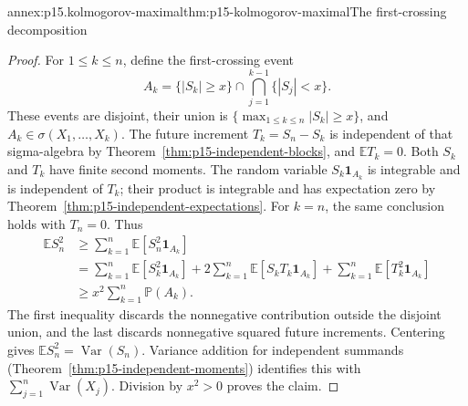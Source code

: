 \begin{annexitem}{annex:p15.kolmogorov-maximal}{thm:p15-kolmogorov-maximal}{The first-crossing decomposition}
\begin{proof}
For \(1\leq k\leq n\), define the first-crossing event
\[
 A_k=\{|S_k|\geq x\}\cap
                  \bigcap_{j=1}^{k-1}\{|S_j|<x\}.
\]
These events are disjoint, their union is
\(\{\max_{1\leq k\leq n}|S_k|\geq x\}\), and
\(A_k\in\sigma(X_1,\ldots,X_k)\).
The future increment \(T_k=S_n-S_k\) is independent of that
sigma-algebra by Theorem~\ref{thm:p15-independent-blocks}, and
\(\mathbb ET_k=0\). Both \(S_k\) and \(T_k\) have finite
second moments. The random variable \(S_k\mathbf1_{A_k}\) is
integrable and is independent of \(T_k\); their product is
integrable and has expectation zero by
Theorem~\ref{thm:p15-independent-expectations}. For \(k=n\),
the same conclusion holds with \(T_n=0\). Thus
\[
 \begin{aligned}
 \mathbb ES_n^2
 &\geq\sum_{k=1}^n\mathbb E[S_n^2\mathbf1_{A_k}]\\
 &=\sum_{k=1}^n\mathbb E[S_k^2\mathbf1_{A_k}]
   +2\sum_{k=1}^n\mathbb E[S_kT_k\mathbf1_{A_k}]
   +\sum_{k=1}^n\mathbb E[T_k^2\mathbf1_{A_k}]\\
 &\geq x^2\sum_{k=1}^n\mathbb P(A_k).
 \end{aligned}
\]
The first inequality discards the nonnegative contribution outside
the disjoint union, and the last discards nonnegative squared future
increments. Centering gives \(\mathbb ES_n^2=\operatorname{Var}(S_n)\).
Variance addition for independent summands
(Theorem~\ref{thm:p15-independent-moments}) identifies this with
\(\sum_{j=1}^n\operatorname{Var}(X_j)\). Division by \(x^2>0\)
proves the claim.
\end{proof}
\end{annexitem}

